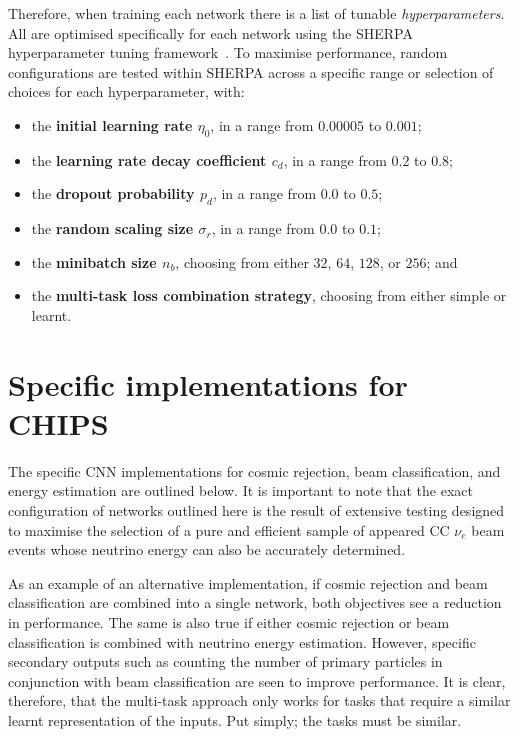 Therefore, when training each network there is a list of tunable \emph{hyperparameters}. All are
optimised specifically for each network using the SHERPA hyperparameter tuning
framework~\cite{hertel2020}. To maximise performance, random configurations are tested within
SHERPA across a specific range or selection of choices for each hyperparameter, with:
\begin{itemize}
    \item the \textbf{initial learning rate $\eta_{0}$}, in a range from $0.00005$ to $0.001$;
    \item the \textbf{learning rate decay coefficient $c_{d}$}, in a range from $0.2$ to $0.8$;
    \item the \textbf{dropout probability $p_{d}$}, in a range from $0.0$ to $0.5$;
    \item the \textbf{random scaling size $\sigma_{r}$}, in a range from $0.0$ to $0.1$;
    \item the \textbf{minibatch size $n_{b}$}, choosing from either $32$, $64$, $128$, or $256$;
    and
    \item the \textbf{multi-task loss combination strategy}, choosing from either simple or
    learnt.
\end{itemize}

\section{Specific implementations for CHIPS} %
\label{sec:cnn_specific} %

The specific CNN implementations for cosmic rejection, beam classification, and energy estimation
are outlined below. It is important to note that the exact configuration of networks outlined here
is the result of extensive testing designed to maximise the selection of a pure and efficient
sample of appeared CC $\nu_{e}$ beam events whose neutrino energy can also be accurately
determined.

As an example of an alternative implementation, if cosmic rejection and beam classification are
combined into a single network, both objectives see a reduction in performance. The same is also
true if either cosmic rejection or beam classification is combined with neutrino energy
estimation. However, specific secondary outputs such as counting the number of primary particles
in conjunction with beam classification are seen to improve performance. It is clear, therefore,
that the multi-task approach only works for tasks that require a similar learnt representation of
the inputs. Put simply; the tasks must be similar.

